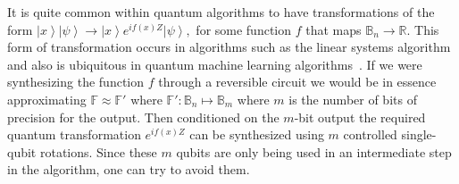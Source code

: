 \documentclass[conference]{IEEEtran}
\newcommand{\fig}[1]{\hyperref[fig:#1]{Figure~\ref*{fig:#1}}}
\newcommand{\openone}{1\!\!1}
\newcommand{\ket}[1]{\left| #1\right\rangle}        %
\newcommand{\nix}[1]{{}}
\begin{document}
\nix{
\begin{table}[t!]
\tiny
\[
\begin{tabular}{c@{\qquad}c@{\qquad}c@{\qquad}c}
\hline\\
Circuit & Function & Success probability& Correction circuit\\[1.5ex]
\hline\\
$e^{-i\phi_1 X} e^{-i\phi_2X}$ & $\phi_1+\phi_2$ & $100\%$& --\\[1.5ex]
${\rm PAR}(\phi_1,\ldots,\phi_k)$ & $\prod_{i=1}^k \phi_i + O(\max_i |\phi_i|^{k+2})$&
$\frac{1}{2}\left(\prod_{i=1}^k \cos(\phi_i)^2 + \prod_{i=1}^k \sin(\phi_i)^2\right)$ & $\openone\text{ or } 2{\rm PAR}(\phi_1,\ldots,\phi_k)$\\[1.5ex]
${\rm GB}(\phi_1,\ldots,\phi_k)$ & $\prod_{i=1}^k \phi^2_i + O(\max_i |\phi_i|^{2k+2})$&
$\left(1-\prod_{i=1}^k \sin^2(\phi_i)\right)^2 + \prod_{i=1}^k \sin^4(\phi_i)$ &
$e^{-i\pi/4 X}$ (Clifford)\\[1ex]
\hline
\end{tabular}
\]
\caption{Effective transformations carried out by the circuits in \fig{circuit} for small input rotations.\label{tab:succprob}}
\end{table}
}

It is quite common within quantum algorithms to have transformations
of the form 
$\ket{x}\ket{\psi} \rightarrow \ket{x}e^{if(x)Z}\ket{\psi},$
for some function $f$ that maps $\mathbb{B}_{n} \rightarrow \mathbb{R}$.  This form of transformation occurs in algorithms such as the linear systems algorithm~\cite{harrow2009quantum} and also is ubiquitous in quantum machine learning algorithms~\cite{lloyd2016quantum,wiebe2016quantum}.  If we were synthesizing the function $f$  through a reversible circuit we would be in essence approximating $\mathbb{F} \approx \mathbb{F}'$ where $\mathbb{F}' : \mathbb{B}_n \mapsto \mathbb{B}_m$ where $m$ is the number of bits of precision for the output.  Then conditioned on the $m$-bit output the required quantum transformation $e^{i f(x)Z}$ can be synthesized using $m$ controlled single-qubit rotations.  Since these $m$ qubits are only being used in an intermediate step in the algorithm, one can try to avoid them. 
\end{document}
